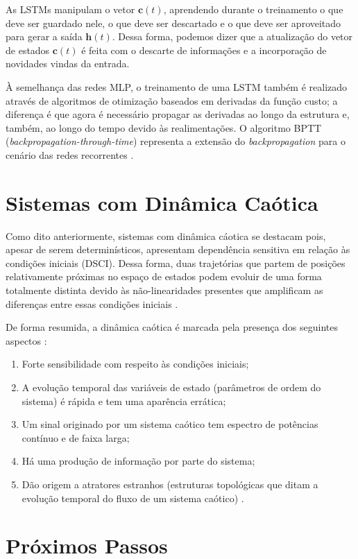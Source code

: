 \documentclass[a4paper, 12pt]{article}
\begin{document}
As LSTMs manipulam o vetor $\mathbf{c}(t)$, aprendendo durante o treinamento o que deve ser guardado nele, o que deve ser descartado e o que deve ser aproveitado para gerar a saída $\mathbf{h}(t)$. Dessa forma, podemos dizer que a atualização do vetor de estados $\mathbf{c}(t)$ é feita com o descarte de informações e a incorporação de novidades vindas da entrada. 

À semelhança das redes MLP, o treinamento de uma LSTM também é realizado através de algoritmos de otimização baseados em derivadas da função custo; a diferença é que agora é necessário propagar as derivadas ao longo da estrutura e, também, ao longo do tempo devido às realimentações. O algoritmo BPTT (\textit{backpropagation-through-time}) representa a extensão do \textit{backpropagation} para o cenário das redes recorrentes \cite{geron2019hands}. 

\section{Sistemas com Dinâmica Caótica}
Como dito anteriormente, sistemas com dinâmica cáotica se destacam pois, apesar de serem determinísticos, apresentam dependência sensitiva em relação às condições iniciais (DSCI). Dessa forma, duas trajetórias que partem de posições relativamente próximas no espaço de estados podem evoluir de uma forma totalmente distinta devido às não-linearidades presentes que amplificam as diferenças entre essas condições iniciais \cite{fiedler1994caos}.

De forma resumida, a dinâmica caótica é marcada pela presença dos seguintes aspectos \cite{attux2001dinamica}:
\begin{enumerate}
\item Forte sensibilidade com respeito às condições iniciais;
\item A evolução temporal das variáveis de estado (parâmetros de ordem do sistema) é rápida e tem uma aparência errática;
\item Um sinal originado por um sistema caótico tem espectro de potências contínuo e de faixa larga;
\item Há uma produção de informação por parte do sistema;
\item Dão origem a atratores estranhos (estruturas topológicas que ditam a evolução temporal do fluxo de um sistema caótico) \cite{ruelle1971nature}.
\end{enumerate}

\section{Próximos Passos}
\end{document}
